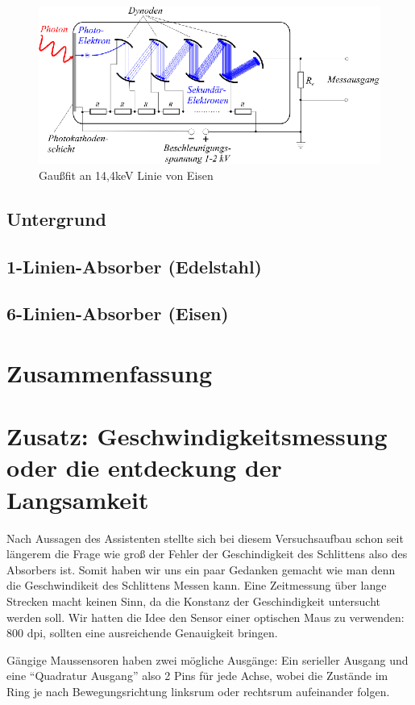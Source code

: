 \documentclass[12pt]{article}
\begin{document}
\begin{figure}[H]
 \includegraphics[width=0.9\linewidth]{pictures/photomultiplier_schema.eps}
 \caption{Gaußfit an 14,4keV Linie von Eisen}
\end{figure}
\subsection{Untergrund}
\subsection{1-Linien-Absorber (Edelstahl)}
\subsection{6-Linien-Absorber (Eisen)}

\section{Zusammenfassung}

\section{Zusatz: Geschwindigkeitsmessung oder die entdeckung der Langsamkeit}
Nach Aussagen des Assistenten stellte sich bei diesem Versuchsaufbau schon seit längerem die Frage wie groß der Fehler der Geschindigkeit des Schlittens also des Absorbers ist. Somit haben wir uns ein paar Gedanken gemacht wie man denn die Geschwindikeit des Schlittens Messen kann. Eine Zeitmessung über lange Strecken macht keinen Sinn, da die Konstanz der Geschindigkeit untersucht werden soll. Wir hatten die Idee den Sensor einer optischen Maus zu verwenden: 800 dpi, sollten eine ausreichende Genauigkeit bringen.

Gängige Maussensoren haben zwei mögliche Ausgänge: Ein serieller Ausgang und eine ``Quadratur Ausgang'' also 2 Pins für jede Achse, wobei die Zustände im Ring je nach Bewegungsrichtung linksrum oder rechtsrum aufeinander folgen.
\end{document}
